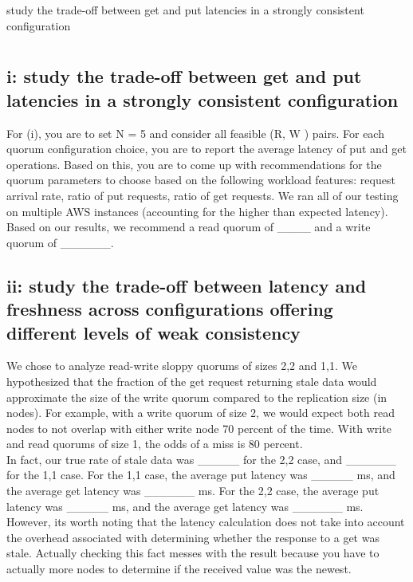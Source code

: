 \documentclass[12pt,letter]{article}
\begin{document}
study the trade-off between get and put latencies in a strongly consistent configuration

\onehalfspacing
\section*{}
\subsection*{i: study the trade-off between get and put latencies in a strongly consistent configuration}
For (i), you are to set N = 5 and consider all feasible (R, W ) pairs. For each quorum configuration choice, you are to report the average latency of put and get operations. Based on this, you are to come up with recommendations for the quorum parameters to choose based on the following workload features: request arrival rate, ratio of put requests, ratio of get requests.
We ran all of our testing on multiple AWS instances (accounting for the higher than expected latency). Based on our results, we recommend a read quorum of ____ and a write quorum of ______.\\

\subsection*{ii: study the trade-off between latency and freshness across configurations offering different levels of weak consistency}
We chose to analyze read-write sloppy quorums of sizes 2,2 and 1,1. We hypothesized that the fraction of the get request returning stale data would approximate the size of the write quorum compared to the replication size (in nodes). For example, with a write quorum of size 2, we would expect both read nodes to not overlap with either write node 70 percent of the time. With write and read quorums of size 1, the odds of a miss is 80 percent.\\

\onehalfspacing
In fact, our true rate of stale data was _____ for the 2,2 case, and ______ for the 1,1 case. For the 1,1 case, the average put latency was _____ ms, and the average get latency was ______ ms. For the 2,2 case, the average put latency was _____ ms, and the average get latency was ______ ms. However, its worth noting that the latency calculation does not take into account the overhead associated with determining whether the response to a get was stale. Actually checking this fact messes with the result because you have to actually more nodes to determine if the received value was the newest. 
\end{document}
